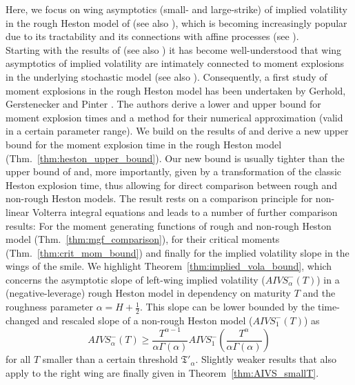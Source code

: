 \documentclass[12pt,a4paper]{amsart}
\numberwithin{equation}{section}
\numberwithin{equation}{section}
\theoremstyle{nonumberplain}
\begin{document}
Here, we focus on wing asymptotics (small- and large-strike) of implied volatility in the rough Heston model of \cite{eleuch2019characteristic} (see also \cite{eleuch2018perfect}), which is becoming increasingly popular due to its tractability and its connections with affine processes (see \cite{jaber2017affine, gatheral2018affine, keller-ressel2018affine}).\\
Starting with the results of \cite{lee2004moment} (see also \cite{benaim2009black}) it has become well-understood that wing asymptotics of implied volatility are intimately connected to moment explosions in the underlying stochastic model (see also \cite{friz2010encyclopedia}). Consequently, a first study of moment explosions in the rough Heston model has been undertaken by Gerhold, Gerstenecker and Pinter \cite{gerhold2018moment}. The authors derive a lower and upper bound for moment explosion times and a method for their numerical approximation (valid in a certain parameter range). We build on the results of \cite{gerhold2018moment} and derive a new upper bound for the moment explosion time in the rough Heston model (Thm.~\ref{thm:heston_upper_bound}). Our new bound is usually tighter than the upper bound of \cite{gerhold2018moment} and, more importantly, given by a transformation of the classic Heston explosion time, thus allowing for direct comparison between rough and non-rough Heston models. The result rests on a comparison principle for non-linear Volterra integral equations and leads to a number of further comparison results: For the moment generating functions of rough and non-rough Heston model (Thm.~\ref{thm:mgf_comparison}), for their critical moments (Thm.~\ref{thm:crit_mom_bound}) and finally for the implied volatility slope in the wings of the smile. We highlight Theorem~\ref{thm:implied_vola_bound}, which concerns the asymptotic slope of left-wing implied volatility ($AIVS_\alpha^-(T)$) in a (negative-leverage) rough Heston model in dependency on maturity $T$ and the roughness parameter $\alpha = H + \tfrac{1}{2}$. This slope can be lower bounded by the time-changed and rescaled slope of a non-rough Heston model ($AIVS_1^-(T)$) as
	\begin{equation*}
		AIVS_{\alpha}^- (T) \ge \frac{T^{\alpha -1}}{\alpha \Gamma(\alpha )} AIVS_1^-\left(\frac{T^{\alpha}}{\alpha \Gamma(\alpha)}\right)
	\end{equation*}
	for all $T$ smaller than a certain threshold $\mathfrak{T}'_\alpha$. 
Slightly weaker results that also apply to the right wing are finally given in Theorem~\ref{thm:AIVS_smallT}.
\end{document}
